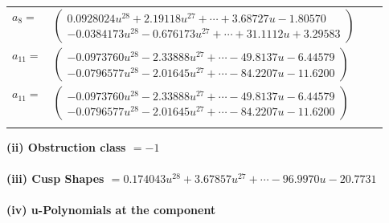 \documentclass[1p]{elsarticle_modified}
\theoremstyle{definition}
\begin{document}
\begin{tabular}{m{7pt} m{180pt} m{7pt} m{180pt} }
\flushright $a_{8}=$&$\begin{pmatrix}0.0928024 u^{28}+2.19118 u^{27}+\cdots+3.68727 u-1.80570\\-0.0384173 u^{28}-0.676173 u^{27}+\cdots+31.1112 u+3.29583\end{pmatrix}$ \\
\flushright $a_{11}=$&$\begin{pmatrix}-0.0973760 u^{28}-2.33888 u^{27}+\cdots-49.8137 u-6.44579\\-0.0796577 u^{28}-2.01645 u^{27}+\cdots-84.2207 u-11.6200\end{pmatrix}$\\ \flushright $a_{11}=$&$\begin{pmatrix}-0.0973760 u^{28}-2.33888 u^{27}+\cdots-49.8137 u-6.44579\\-0.0796577 u^{28}-2.01645 u^{27}+\cdots-84.2207 u-11.6200\end{pmatrix}$\\&\end{tabular}
\flushleft \textbf{(ii) Obstruction class $= -1$}\\~\\
\flushleft \textbf{(iii) Cusp Shapes $= 0.174043 u^{28}+3.67857 u^{27}+\cdots-96.9970 u-20.7731$}\\~\\
\newpage\renewcommand{\arraystretch}{1}
\flushleft \textbf{(iv) u-Polynomials at the component}\newline \\
\end{document}
